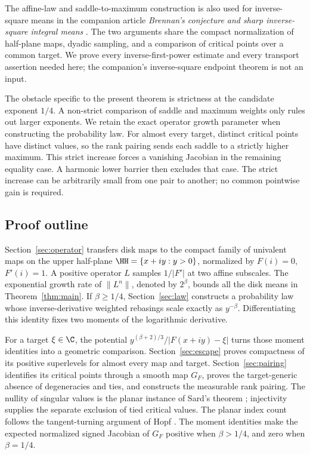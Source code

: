 The affine-law and saddle-to-maximum construction is also used for
inverse-square means in the companion article
\emph{Brennan's conjecture and sharp inverse-square integral means}
\cite{BrennanMethod}. The two arguments share the compact
normalization of half-plane maps, dyadic sampling, and a comparison
of critical points over a common target. We prove every
inverse-first-power estimate and every transport assertion needed
here; the companion's inverse-square endpoint theorem is not an
input.

The obstacle specific to the present theorem is strictness at the
candidate exponent \(1/4\). A non-strict comparison of saddle and
maximum weights only rules out larger exponents. We retain the exact
operator growth parameter when constructing the probability law.
For almost every target, distinct critical points have distinct
values, so the rank pairing sends each saddle to a strictly higher
maximum. This strict increase forces a vanishing Jacobian in the
remaining equality case. A harmonic lower barrier then excludes
that case. The strict increase can be arbitrarily small from one
pair to another; no common pointwise gain is required.

\subsection{Proof outline}

Section~\ref{sec:operator} transfers disk maps to the compact family
of univalent maps on the upper half-plane \(\HH=\{x+iy:y>0\}\),
normalized by \(F(i)=0\),
\(F'(i)=1\). A positive operator \(L\) samples \(1/|F'|\) at two
affine subscales. The exponential growth rate of \(\|L^n\|\), denoted
by \(2^\beta\), bounds all the disk means in Theorem~\ref{thm:main}.
If \(\beta\ge1/4\), Section~\ref{sec:law} constructs a probability
law whose inverse-derivative weighted rebasings scale exactly as
\(y^{-\beta}\). Differentiating this identity fixes two moments of
the logarithmic derivative.

For a target \(\xi\in\C\), the potential
\(y^{(\beta+2)/3}/|F(x+iy)-\xi|\) turns those moment identities into
a geometric comparison. Section~\ref{sec:escape} proves compactness
of its positive superlevels for almost every map and target.
Section~\ref{sec:pairing} identifies its critical points through a
smooth map \(G_F\), proves the target-generic absence of degeneracies
and ties, and constructs the measurable rank pairing. The nullity of singular
values is the planar instance of Sard's theorem \cite{Sard}; injectivity
supplies the separate exclusion of tied critical values. The planar
index count follows the tangent-turning argument of Hopf \cite{Hopf}.
The moment identities make the expected normalized signed Jacobian
of \(G_F\) positive when \(\beta>1/4\), and zero when \(\beta=1/4\).

